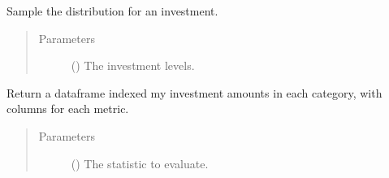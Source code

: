 \documentclass[letterpaper,10pt,english]{sphinxmanual}
\begin{document}
\begin{fulllineitems}
\begin{fulllineitems}
\end{fulllineitems}


\begin{fulllineitems}
\label{\detokenize{tyche:tyche.Evaluator.Evaluator.evaluate}}
Sample the distribution for an investment.
\begin{quote}\begin{description}
\item[{Parameters}] \leavevmode
{} () \textendash{} The investment levels.

\end{description}\end{quote}

\end{fulllineitems}


\begin{fulllineitems}
\label{\detokenize{tyche:tyche.Evaluator.Evaluator.evaluate_corners_semilong}}
Return a dataframe indexed my investment amounts in each category,
with columns for each metric.
\begin{quote}\begin{description}
\item[{Parameters}] \leavevmode
{} () \textendash{} The statistic to evaluate.

\end{description}\end{quote}

\end{fulllineitems}



\end{fulllineitems}
\end{document}
